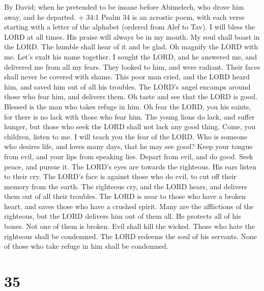 By David; when he pretended to be insane before Abimelech, who drove him
away, and he departed.  + 34:1 Psalm 34 is an acrostic poem,
with each verse starting with a letter of the alphabet (ordered from
Alef to Tav). I will bless the LORD at all times. His praise will always
be in my mouth.  My soul shall boast in the LORD. The humble
shall hear of it and be glad.  Oh magnify the LORD with me.
Let's exalt his name together.  I sought the LORD, and he
answered me, and delivered me from all my fears.  They
looked to him, and were radiant. Their faces shall never be covered with
shame.  This poor man cried, and the LORD heard him, and
saved him out of all his troubles.  The LORD's angel encamps
around those who fear him, and delivers them.  Oh taste and
see that the LORD is good. Blessed is the man who takes refuge in him.
 Oh fear the LORD, you his saints, for there is no lack with
those who fear him.  The young lions do lack, and suffer
hunger, but those who seek the LORD shall not lack any good thing.
 Come, you children, listen to me. I will teach you the
fear of the LORD.  Who is someone who desires life, and
loves many days, that he may see good?  Keep your tongue
from evil, and your lips from speaking lies.  Depart from
evil, and do good. Seek peace, and pursue it.  The LORD's
eyes are towards the righteous. His ears listen to their cry.
 The LORD's face is against those who do evil, to cut off
their memory from the earth.  The righteous cry, and the
LORD hears, and delivers them out of all their troubles. 
The LORD is near to those who have a broken heart, and saves those who
have a crushed spirit.  Many are the afflictions of the
righteous, but the LORD delivers him out of them all.  He
protects all of his bones. Not one of them is broken.  Evil
shall kill the wicked. Those who hate the righteous shall be condemned.
 The LORD redeems the soul of his servants. None of those
who take refuge in him shall be condemned.

\hypertarget{section-34}{%
\section{35}\label{section-34}}

